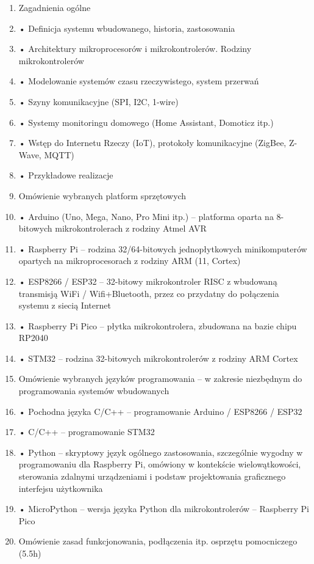 \documentclass[12pt, a4paper]{article}
\begin{document}
\begin{enumerate}
  \item Zagadnienia ogólne
  \item • Definicja systemu wbudowanego, historia, zastosowania
  \item • Architektury mikroprocesorów i mikrokontrolerów. Rodziny mikrokontrolerów
  \item • Modelowanie systemów czasu rzeczywistego, system przerwań
  \item • Szyny komunikacyjne (SPI, I2C, 1-wire)
  \item • Systemy monitoringu domowego (Home Assistant, Domoticz itp.)
  \item • Wstęp do Internetu Rzeczy (IoT), protokoły komunikacyjne (ZigBee, Z-Wave, MQTT)
  \item • Przykładowe realizacje
  \item Omówienie wybranych platform sprzętowych
  \item • Arduino (Uno, Mega, Nano, Pro Mini itp.) – platforma oparta na 8-bitowych mikrokontrolerach z rodziny Atmel AVR
  \item • Raspberry Pi – rodzina 32/64-bitowych jednopłytkowych minikomputerów opartych na mikroprocesorach z rodziny ARM (11, Cortex)
  \item • ESP8266 / ESP32 – 32-bitowy mikrokontroler RISC z wbudowaną transmisją WiFi / Wifi+Bluetooth, przez co przydatny do połączenia systemu z siecią Internet
  \item • Raspberry Pi Pico – płytka mikrokontrolera, zbudowana na bazie chipu RP2040
  \item • STM32 – rodzina 32-bitowych mikrokontrolerów z rodziny ARM Cortex
  \item Omówienie wybranych języków programowania – w zakresie niezbędnym do programowania systemów wbudowanych
  \item • Pochodna języka C/C++ – programowanie Arduino / ESP8266 / ESP32
  \item • C/C++ – programowanie STM32
  \item • Python – skryptowy język ogólnego zastosowania, szczególnie wygodny w programowaniu dla Raspberry Pi, omówiony w kontekście wielowątkowości, sterowania zdalnymi urządzeniami i podstaw projektowania graficznego interfejsu użytkownika
  \item • MicroPython – wersja języka Python dla mikrokontrolerów – Raspberry Pi Pico
  \item Omówienie zasad funkcjonowania, podłączenia itp. osprzętu pomocniczego (5.5h)

\end{enumerate}
\end{document}
